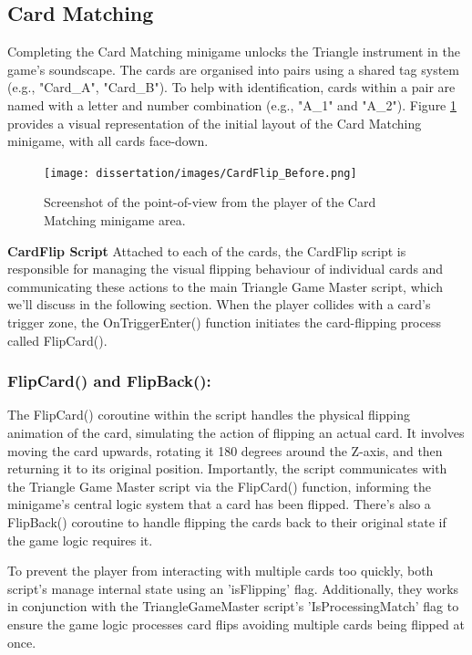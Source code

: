 \documentclass{l4proj}
\begin{document}
\subsection{Card Matching}
Completing the Card Matching minigame unlocks the Triangle instrument in the game's soundscape. The cards are organised into pairs using a shared tag system (e.g., "Card\_A", "Card\_B"). To help with identification, cards within a pair are named with a letter and number combination (e.g., "A\_1" and "A\_2"). Figure \ref{fig:card_matching_overview} provides a visual representation of the initial layout of the Card Matching minigame, with all cards face-down.

\begin{figure}[h]
  \centering
  \texttt{[image: dissertation/images/CardFlip\_Before.png]} 

  \caption{Screenshot of the point-of-view from the player of the Card Matching minigame area.}

  \label{fig:card_matching_overview} 
\end{figure}

\textbf{CardFlip Script} \newline
Attached to each of the cards, the CardFlip script is responsible for managing the visual flipping behaviour of individual cards and communicating these actions to the main Triangle Game Master script, which we'll discuss in the following section. When the player collides with a card's trigger zone, the OnTriggerEnter() function initiates the card-flipping process called FlipCard().

\subsubsection{FlipCard() and FlipBack():} The FlipCard() coroutine within the script handles the physical flipping animation of the card, simulating the action of flipping an actual card. It involves moving the card upwards, rotating it 180 degrees around the Z-axis, and then returning it to its original position. Importantly, the script communicates with the Triangle Game Master script via the FlipCard() function, informing the minigame's central logic system that a card has been flipped. There's also a FlipBack() coroutine to handle flipping the cards back to their original state if the game logic requires it.

To prevent the player from interacting with multiple cards too quickly, both script's manage internal state using an 'isFlipping' flag. Additionally, they works in conjunction with the TriangleGameMaster script's 'IsProcessingMatch' flag to ensure the game logic processes card flips avoiding multiple cards being flipped at once.
\end{document}
